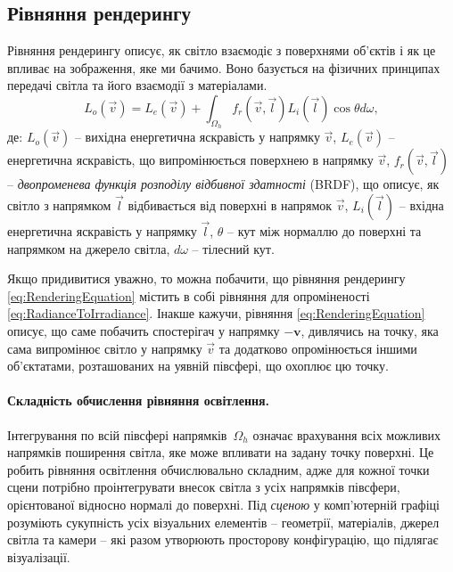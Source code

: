 \subsection{Рівняння рендерингу} \phantom{Латех просто не скидати текст на новий рядок}
\par Рівняння рендерингу описує, як світло взаємодіє з поверхнями об'єктів і як це впливає на зображення, яке ми бачимо. Воно базується на фізичних принципах 
передачі світла та його взаємодії з матеріалами.
\begin{equation}
\label{eq:RenderingEquation}
  L_o(\vec{v}) = L_e(\vec{v}) + \int_{\Omega_h} f_r(\vec{v},\vec{l} ) L_i(\vec{l}) \cos{\theta} d\omega,
\end{equation} де: $L_o(\vec{v})$ -- вихідна енергетична яскравість у напрямку $\vec{v}$, $L_e(\vec{v})$ -- енер\-ге\-тич\-на яскравість, що випромінюється поверхнею в напрямку $\vec{v}$,
$f_r(\vec{v},\vec{l})$ -- \textit{двопроменева функція розподілу відбивної здатності} (BRDF), що описує, як світло з напрямком $\vec{l}$ відбивається від 
поверхні в напрямок $\vec{v}$, $L_i(\vec{l})$ -- вхідна енер\-ге\-тич\-на яскравість у напрямку $\vec{l}$, 
$\theta$ -- кут між нормаллю до поверхні та напрямком на джерело світла, $d\omega$ -- тілесний кут.
\par
Якщо придивитися уважно, то можна побачити, що рівняння рендерингу \ref{eq:RenderingEquation} містить в собі рівняння для опроміненості \eqref{eq:RadianceToIrradiance}. Інакше кажучи, рівняння \ref{eq:RenderingEquation} описує, що саме побачить спостерігач у напрямку $\mathbf{-v}$, дивлячись на точку, яка сама 
випромінює світло у напрямку $\vec{v}$ та додатково опромінюється іншими об'єктатами, розташованих на уявній півсфері, що охоплює цю точку.

\paragraph{Складність обчислення рівняння освітлення.}

Інтегрування по всій півсфері напрямків~$\Omega_h$ означає врахування всіх можливих напрямків по\-ши\-рен\-ня світла, яке може впливати на задану точку поверхні.
Це робить рівняння освітлення обчислювально складним, адже для кожної точки сцени потрібно проінтегрувати внесок світла з усіх напрямків півсфери, орієнтованої відносно нормалі до поверхні.
Під \textit{сценою} у комп’ютерній графіці розуміють сукупність усіх візуальних елементів -- геометрії, матеріалів, джерел світла та камери -- які разом утворюють просторову конфігурацію, що підлягає візуалізації.

